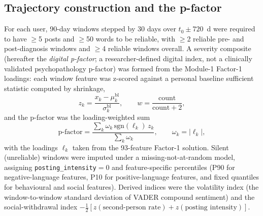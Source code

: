 \documentclass[11pt]{article}
\begin{document}
\subsection*{Trajectory construction and the p-factor}
For each user, 90-day windows stepped by 30 days over $t_0\pm720$~d were required to have
$\ge$5 posts and $\ge$50 words to be reliable, with $\ge$2 reliable pre- and post-diagnosis
windows and $\ge$4 reliable windows overall. A severity composite (hereafter the \emph{digital
p-factor}; a researcher-defined digital index, not a clinically validated psychopathology
p-factor) was formed from
the Module-1 Factor-1 loadings: each window feature was z-scored against a personal baseline
sufficient statistic computed by shrinkage,
\begin{equation}
z_k=\frac{x_k-\mu_{k}^{\mathrm{bl}}}{\sigma_{k}^{\mathrm{bl}}},\qquad
w=\frac{\text{count}}{\text{count}+2},
\label{eq:baseline}
\end{equation}
and the p-factor was the loading-weighted sum
\begin{equation}
\mathrm{p\text{-}factor}=\frac{\sum_k \omega_k\,\mathrm{sgn}(\ell_k)\,z_k}{\sum_k \omega_k},
\qquad \omega_k=|\ell_k|,
\label{eq:pfactor}
\end{equation}
with the loadings $\ell_k$ taken from the 93-feature Factor-1 solution. Silent (unreliable)
windows were imputed under a missing-not-at-random model, assigning
\texttt{posting\_intensity}$=0$ and feature-specific percentiles (P90 for negative-language
features, P10 for positive-language features, and fixed quantiles for behavioural and social
features). Derived indices were the volatility index (the window-to-window standard deviation of
VADER compound sentiment) and the social-withdrawal index
$-\tfrac12[z(\text{second-person rate})+z(\text{posting intensity})]$.
\end{document}
